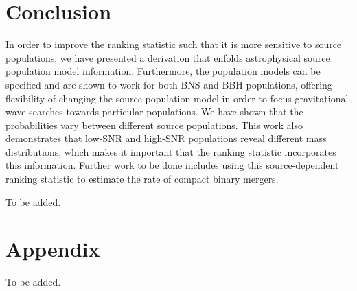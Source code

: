 \documentclass[twocolumn,showpacs,unsortedaddress,superscriptaddress,showkeys,nofootinbib,preprintnumbers,letterpaper]{revtex4-1}
\begin{document}

\section{Conclusion} \label{sec:conclusion}

In order to improve the ranking statistic such that it is more sensitive to source populations, we have presented a derivation that enfolds astrophysical source population model information. Furthermore, the population models can be specified and are shown to work for both BNS and BBH populations, offering flexibility of changing the source population model in order to focus gravitational-wave searches towards particular populations. We have shown that the probabilities vary between different source populations. This work also demonstrates that low-SNR and high-SNR populations reveal different mass distributions, which makes it important that the ranking statistic incorporates this information. Further work to be done includes using this source-dependent ranking statistic to estimate the rate of compact binary mergers.

\acknowledgments

To be added.

\appendix

\section{Appendix}
\label{appendix2}

To be added.



\end{document}
